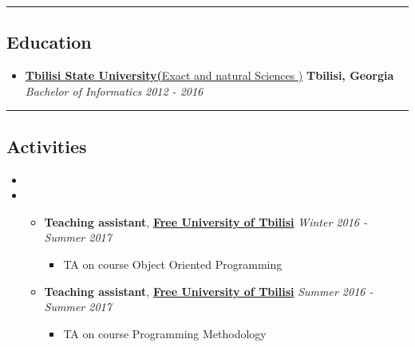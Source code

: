 \documentclass[10pt,letterpaper]{article}
\begin{document}
\hrule
\vspace{-1.0em}
\subsection*{Education}
  \begin{itemize}
    \parskip=-0.5em

    \item[]
    {\href{https://www.tsu.ge/en/}{\textbf{Tbilisi State University\normalfont (}Exact and natural Sciences{\normalfont
)}} \hfill
      \textbf{Tbilisi, Georgia}}
    \\
    {\emph{Bachelor of Informatics} \hfill
      \emph{2012 - 2016}}

  \end{itemize}


\hrule
\vspace{-1.0em}
\subsection*{Activities}
  \begin{itemize}
    \parskip=-0.5em

\item[]

    \item[]
    \begin{itemize}
        \item{\textbf{Teaching assistant}, \textbf{\href{https://www.freeuni.edu.ge/en}{Free University of Tbilisi}}
        \hfill\emph{Winter 2016 - Summer 2017}
        \begin{itemize}
            \item TA on course Object Oriented Programming
        \end{itemize} }

        \item{\textbf{Teaching assistant}, \textbf{\href{https://www.freeuni.edu.ge/en}{Free University of Tbilisi}}
        \hfill\emph{Summer 2016 - Summer 2017}
        \begin{itemize}
            \item TA on course Programming Methodology
        \end{itemize}}
    \end{itemize}

  \end{itemize}
\end{document}
